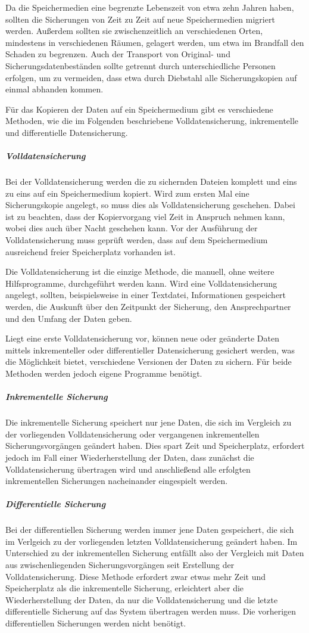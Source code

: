 Da die Speichermedien eine begrenzte Lebenszeit von etwa zehn Jahren haben, sollten die Sicherungen von Zeit zu Zeit auf neue Speichermedien migriert werden. Außerdem sollten sie zwischenzeitlich an verschiedenen Orten, mindestens in verschiedenen Räumen, gelagert werden, um etwa im Brandfall den Schaden zu begrenzen. Auch der Transport von Original- und Sicherungsdatenbeständen sollte getrennt durch unterschiedliche Personen erfolgen, um zu vermeiden, dass etwa durch Diebstahl alle Sicherungskopien auf einmal abhanden kommen. 

Für das Kopieren der Daten auf ein Speichermedium gibt es verschiedene Methoden, wie die im Folgenden beschriebene Volldatensicherung, inkrementelle und differentielle Datensicherung.

\subparagraph{Volldatensicherung} Bei der Volldatensicherung werden die zu sichernden Dateien komplett und eins zu eins auf ein Speichermedium kopiert. Wird zum ersten Mal eine Sicherungskopie angelegt, so muss dies als Volldatensicherung geschehen. Dabei ist zu beachten, dass der Kopiervorgang viel Zeit in Anspruch nehmen kann, wobei dies auch über Nacht geschehen kann. Vor der Ausführung der Volldatensicherung muss geprüft werden, dass auf dem Speichermedium ausreichend freier Speicherplatz vorhanden ist. 

Die Volldatensicherung ist die einzige Methode, die manuell, ohne weitere Hilfsprogramme, durchgeführt werden kann. Wird eine Volldatensicherung angelegt, sollten, beispielsweise in einer Textdatei, Informationen gespeichert werden, die Auskunft über den Zeitpunkt der Sicherung, den Ansprechpartner und den Umfang der Daten geben.

Liegt eine erste Volldatensicherung vor, können neue oder geänderte Daten mittels inkrementeller oder differentieller Datensicherung gesichert werden, was die Möglichkeit bietet, verschiedene Versionen der Daten zu sichern. Für beide Methoden werden jedoch eigene Programme benötigt.

\subparagraph{Inkrementelle Sicherung} Die inkrementelle Sicherung speichert nur jene Daten, die sich im Vergleich zu der vorliegenden Volldatensicherung oder vergangenen inkrementellen Sicherungsvorgängen geändert haben. Dies spart Zeit und Speicherplatz, erfordert jedoch im Fall einer Wiederherstellung der Daten, dass zunächst die Volldatensicherung übertragen wird und anschließend alle erfolgten inkrementellen Sicherungen nacheinander eingespielt werden.

\subparagraph{Differentielle Sicherung} Bei der differentiellen Sicherung werden immer jene Daten gespeichert, die sich im Verlgeich zu der vorliegenden letzten Volldatensicherung geändert haben. Im Unterschied zu der inkrementellen Sicherung entfällt also der Vergleich mit Daten aus zwischenliegenden Sicherungsvorgängen seit Erstellung der Volldatensicherung. Diese Methode erfordert zwar etwas mehr Zeit und Speicherplatz als die inkrementelle Sicherung, erleichtert aber die Wiederherstellung der Daten, da nur die Volldatensicherung und die letzte differentielle Sicherung auf das System übertragen werden muss. Die vorherigen differentiellen Sicherungen werden nicht benötigt.

